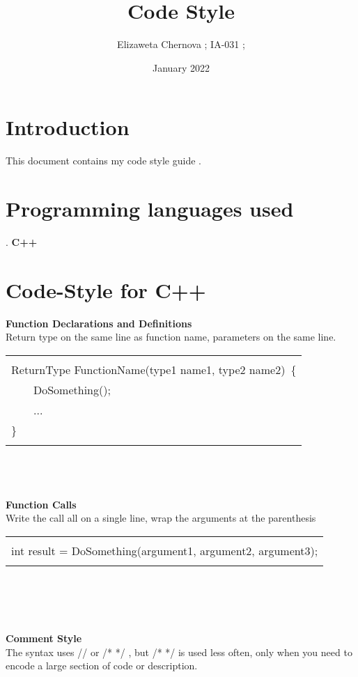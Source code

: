 \documentclass{article}
\title{Code Style}
\author{Elizaweta Chernova ; IA-031 ;}
\affil{SibSUTIS, email: elizaweta\_02@mail.ru .}
\date{January 2022}
\begin{document}
\maketitle

\section{Introduction}
This document contains my code style guide .
\section{Programming languages used}.
\textbf{\large{C++\cite{CPP}}}\\
\section{Code-Style for C++} 
\textbf{\large{Function Declarations and Definitions\cite{CPP1}}}\\
Return type on the same line as function name, parameters on the same line. \\

\begin{tabular}{|p{}|}
\hline\\
ReturnType FunctionName(type1 name1, type2 name2)\ \{ \\ 
\ \ \ \ DoSomething(); \\
\ \ \ \ ...\\ 
\} \\ \\
\hline
\end{tabular}\\ \\ \\ 
\textbf{\large{Function Calls}}\\
Write the call all on a single line, wrap the arguments at the parenthesis\\ 

\begin{tabular}{|p{}|}
\hline\\
int result = DoSomething(argument1, argument2, argument3); \\ \\
\hline
\end{tabular}\\ \\ \\ \\
\textbf{\large{Comment Style\cite{CPP3}}}\\
The syntax uses // or /* */ , but /* */ is used less often, only when you need to encode a large section of code or description. \\ \\
\end{document}
